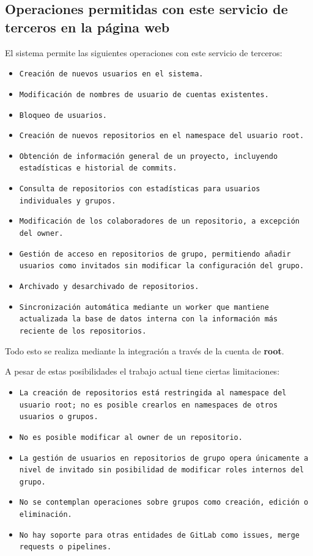 \subsection{Operaciones permitidas con este servicio de terceros en la página web}
El sistema permite las siguientes operaciones con este servicio de terceros:

\begin{itemize}
\item \texttt{Creación de nuevos usuarios en el sistema.}
\item \texttt{Modificación de nombres de usuario de cuentas existentes.}
\item \texttt{Bloqueo de usuarios.}
\item \texttt{Creación de nuevos repositorios en el namespace del usuario root.}
\item \texttt{Obtención de información general de un proyecto, incluyendo estadísticas e historial de commits.}
\item \texttt{Consulta de repositorios con estadísticas para usuarios individuales y grupos.}
\item \texttt{Modificación de los colaboradores de un repositorio, a excepción del owner.}
\item \texttt{Gestión de acceso en repositorios de grupo, permitiendo añadir usuarios como invitados sin modificar la configuración del grupo.}
\item \texttt{Archivado y desarchivado de repositorios.}
\item \texttt{Sincronización automática mediante un worker que mantiene actualizada la base de datos interna con la información más reciente de los repositorios.}
\end{itemize}

Todo esto se realiza mediante la integración a través de la cuenta de \textbf{root}.

A pesar de estas posibilidades el trabajo actual tiene ciertas limitaciones:
\begin{itemize}
\item \texttt{La creación de repositorios está restringida al namespace del usuario root; no es posible crearlos en namespaces de otros usuarios o grupos.}
\item \texttt{No es posible modificar al owner de un repositorio.}
\item \texttt{La gestión de usuarios en repositorios de grupo opera únicamente a nivel de invitado sin posibilidad de modificar roles internos del grupo.}
\item \texttt{No se contemplan operaciones sobre grupos como creación, edición o eliminación.}
\item \texttt{No hay soporte para otras entidades de GitLab como issues, merge requests o pipelines.}
\end{itemize}


